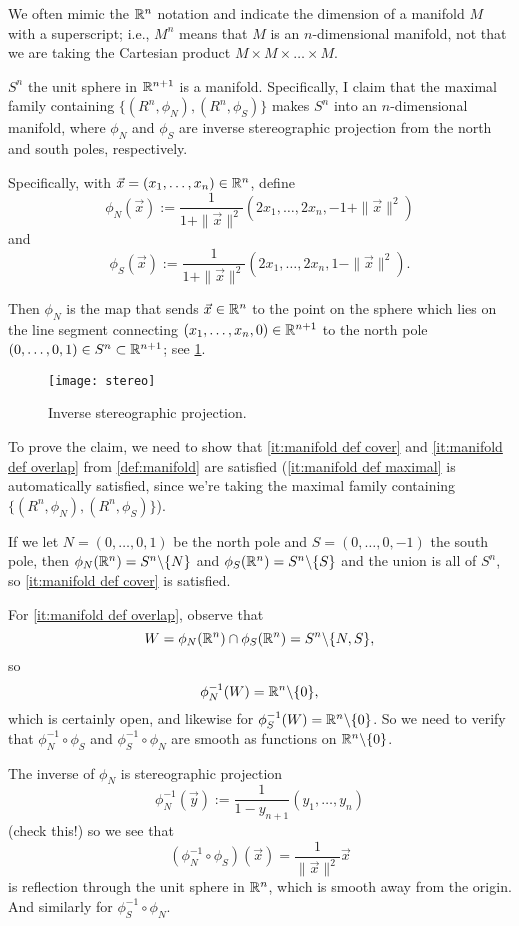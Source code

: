 \begin{remark}
	We often mimic the $\mathbb{R}^n$ notation and indicate the dimension of a manifold $M$ with a superscript; i.e., $M^n$ means that $M$ is an $n$-dimensional manifold, not that we are taking the Cartesian product $M \times M \times \dots \times M$.
\end{remark}

\begin{example}
	$S^n$ the unit sphere in $\mathbb{R}^{n+1}$ is a manifold. Specifically, I claim that the maximal family containing $\{(R^n, \phi_N), (R^n, \phi_S)\}$ makes $S^n$ into an $n$-dimensional manifold, where $\phi_N$ and $\phi_S$ are inverse stereographic projection from the north and south poles, respectively. 
	
	Specifically, with $\vec{x} = (x_1, \dots , x_n) \in \mathbb{R}^n$, define
	\[
		\phi_N(\vec{x}) := \frac{1}{1+\|\vec{x}\|^2}\left(2x_1, \dots , 2x_n, -1+\|\vec{x}\|^2\right)
	\]
	and
	\[
		\phi_S(\vec{x}) := \frac{1}{1+\|\vec{x}\|^2}\left(2x_1, \dots , 2x_n, 1-\|\vec{x}\|^2\right).
	\]
	
	Then $\phi_N$ is the map that sends $\vec{x} \in \mathbb{R}^n$ to the point on the sphere which lies on the line segment connecting $(x_1,\dots , x_n, 0) \in \mathbb{R}^{n+1}$ to the north pole $(0, \dots , 0, 1) \in S^n \subset \mathbb{R}^{n+1}$; see \cref{fig:stereo}. 
	
	\begin{figure}[htbp]
		\centering
			\texttt{[image: stereo]}
		\caption{Inverse stereographic projection.}
		\label{fig:stereo}
	\end{figure}

To prove the claim, we need to show that \ref{it:manifold def cover} and \ref{it:manifold def overlap} from \cref{def:manifold} are satisfied (\ref{it:manifold def maximal} is automatically satisfied, since we're taking the maximal family containing $\{(R^n, \phi_N), (R^n, \phi_S)\}$). 

If we let $N = (0,\dots , 0, 1)$ be the north pole and $S = (0,\dots , 0, -1)$ the south pole, then $\phi_N(\mathbb{R}^n) = S^n \backslash\{N\}$ and $\phi_S(\mathbb{R}^n) = S^n \backslash\{S\}$ and the union is all of $S^n$, so \ref{it:manifold def cover} is satisfied.

For \ref{it:manifold def overlap}, observe that
\[
	W = \phi_N(\mathbb{R}^n) \cap \phi_S(\mathbb{R}^n) = S^n \backslash\{N,S\},
\]
so 
\[
	\phi_N^{-1}(W) = \mathbb{R}^n \backslash\{0\},
\]
which is certainly open, and likewise for $\phi_S^{-1}(W) = \mathbb{R}^n \backslash\{0\}$. So we need to verify that $\phi_N^{-1} \circ \phi_S$ and $\phi_S^{-1} \circ \phi_N$ are smooth as functions on $\mathbb{R}^n \backslash\{0\}$.

The inverse of $\phi_N$ is stereographic projection 
\[
	\phi_N^{-1}(\vec{y}) := \frac{1}{1-y_{n+1}} (y_1, \dots , y_n)
\]
(check this!) so we see that
\[
	(\phi_N^{-1} \circ \phi_S)(\vec{x}) = \frac{1}{\|\vec{x}\|^2}\vec{x}
\]
is reflection through the unit sphere in $\mathbb{R}^n$, which is smooth away from the origin. And similarly for $\phi_S^{-1} \circ \phi_N$.
\end{example}

